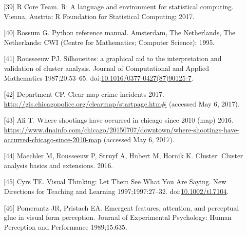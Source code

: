\documentclass[]{article}
\begin{document}
\hypertarget{ref-RSoftware}{}
{[}39{]} R Core Team. R: A language and environment for statistical
computing. Vienna, Austria: R Foundation for Statistical Computing;
2017.

\hypertarget{ref-Rossum:1995:PRM:869369}{}
{[}40{]} Rossum G. Python reference manual. Amsterdam, The Netherlands,
The Netherlands: CWI (Centre for Mathematics; Computer Science); 1995.

\hypertarget{ref-Rousseeuw:1987gv}{}
{[}41{]} Rousseeuw PJ. Silhouettes: a graphical aid to the
interpretation and validation of cluster analysis. Journal of
Computational and Applied Mathematics 1987;20:53--65.
doi:\href{https://doi.org/10.1016/0377-0427(87)90125-7}{10.1016/0377-0427(87)90125-7}.

\hypertarget{ref-chicagoPoliceMap}{}
{[}42{]} Department CP. Clear map crime incidents 2017.
\url{http://gis.chicagopolice.org/clearmap/startpage.htm\#} (accessed
May 6, 2017).

\hypertarget{ref-chicagoShootingsMap}{}
{[}43{]} Ali T. Where shootings have occurred in chicago since 2010
(map) 2016.
\url{https://www.dnainfo.com/chicago/20150707/downtown/where-shootings-have-occurred-chicago-since-2010-map}
(accessed May 6, 2017).

\hypertarget{ref-clusterR}{}
{[}44{]} Maechler M, Rousseeuw P, Struyf A, Hubert M, Hornik K. Cluster:
Cluster analysis basics and extensions. 2016.

\hypertarget{ref-Cyrs:1997gz}{}
{[}45{]} Cyrs TE. Visual Thinking: Let Them See What You Are Saying. New
Directions for Teaching and Learning 1997;1997:27--32.
doi:\href{https://doi.org/10.1002/tl.7104}{10.1002/tl.7104}.

\hypertarget{ref-pomerantz1989emergent}{}
{[}46{]} Pomerantz JR, Pristach EA. Emergent features, attention, and
perceptual glue in visual form perception. Journal of Experimental
Psychology: Human Perception and Performance 1989;15:635.
\end{document}
